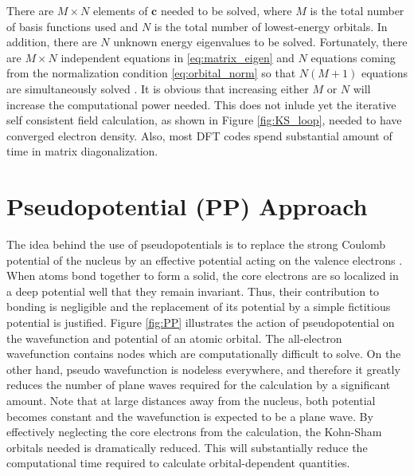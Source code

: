 There are $M \times N$ elements of $\bm{c}$ needed to be solved, where $M$ is the total number of basis functions used and $N$ is the total number of lowest-energy orbitals. In addition, there are $N$ unknown energy eigenvalues to be solved. Fortunately, there are $M \times N$ independent equations in \eqref{eq:matrix_eigen} and $N$ equations coming from the normalization condition \eqref{eq:orbital_norm} so that $N(M+1)$  equations are simultaneously solved \citep{Cottenier2013}. It is obvious that increasing either $M$ or $N$ will increase the computational power needed. This does not inlude yet the  iterative self consistent field calculation, as shown in Figure \ref{fig:KS_loop}, needed to have converged electron density. Also, most DFT codes spend substantial amount of time in matrix diagonalization.

\section{Pseudopotential (PP) Approach}
    The idea behind the use of pseudopotentials is to replace the strong Coulomb potential of the nucleus by an effective potential acting on the valence electrons \citep{Phillips1958,Phillips1959,Cohen1970}. When atoms bond together to form a solid, the core electrons are so localized in a deep potential well that they remain invariant. Thus, their contribution to bonding is negligible and the replacement of its potential by a simple fictitious potential is justified. Figure \ref{fig:PP} illustrates the action of pseudopotential on the wavefunction and potential of an atomic orbital. The all-electron wavefunction contains nodes which are  computationally difficult to  solve. On the other hand, pseudo wavefunction is nodeless everywhere, and therefore  it greatly reduces the number of plane waves required for the calculation by a significant amount. Note that at large distances away from the nucleus, both potential becomes constant and the wavefunction is expected to be a plane wave. By effectively neglecting the core electrons from the calculation, the Kohn-Sham orbitals needed is dramatically reduced. This will substantially reduce the computational time required to calculate orbital-dependent quantities.


